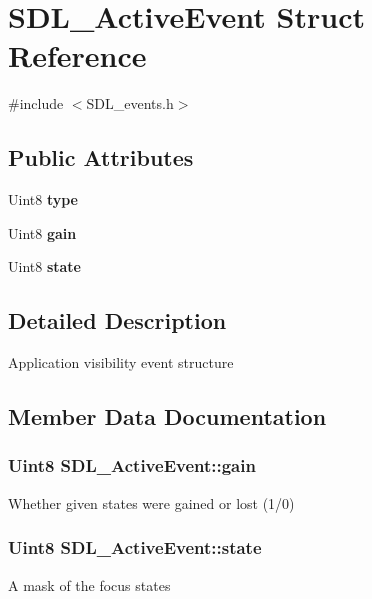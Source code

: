 \section{S\+D\+L\+\_\+\+Active\+Event Struct Reference}
\label{struct_s_d_l___active_event}


{\ttfamily \#include $<$S\+D\+L\+\_\+events.\+h$>$}

\subsection*{Public Attributes}
\begin{DoxyCompactItemize}
\item 
Uint8 {\bf type}
\item 
Uint8 {\bf gain}
\item 
Uint8 {\bf state}
\end{DoxyCompactItemize}


\subsection{Detailed Description}
Application visibility event structure 

\subsection{Member Data Documentation}
\subsubsection[{gain}]{\setlength{\rightskip}{0pt plus 5cm}Uint8 S\+D\+L\+\_\+\+Active\+Event\+::gain}\label{struct_s_d_l___active_event_a4887e4fa212696de9fa8803691dfe5c9}
Whether given states were gained or lost (1/0) 
\subsubsection[{state}]{\setlength{\rightskip}{0pt plus 5cm}Uint8 S\+D\+L\+\_\+\+Active\+Event\+::state}\label{struct_s_d_l___active_event_af8f060502a9c906b25a4aa9c61f745f9}
A mask of the focus states 

